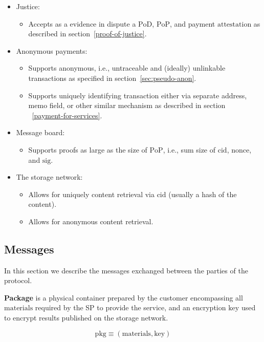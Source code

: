 \documentclass{ieeeaccess}
\begin{document}
\begin{itemize}
\item Justice:
    \begin{itemize}
        \item Accepts as a evidence in dispute a $\mathrm{PoD}$, $\mathrm{PoP}$, and payment $\mathrm{attestation}$ as described in section~\ref{proof-of-justice}.
    \end{itemize}

\item Anonymous payments:
    \begin{itemize}
        \item Supports anonymous, i.e., untraceable and (ideally) unlinkable transactions as specified in section~\ref{sec:pseudo-anon}.
        \item Supports uniquely identifying transaction either via separate address, memo field, or other similar mechanism as described in section ~\ref{payment-for-services}. 
    \end{itemize}

\item Message board:
    \begin{itemize}
        \item Supports proofs as large as the size of $\mathrm{PoP}$, i.e., sum size of $\mathrm{cid}$, $\mathrm{nonce}$, and $\mathrm{sig}$.
    \end{itemize}

\item The storage network:
    \begin{itemize}
        \item Allows for uniquely content retrieval via $\mathrm{cid}$ (usually a hash of the content).
        \item Allows for anonymous content retrieval.
    \end{itemize}
\end{itemize}

\subsection{Messages}\label{messages}
In this section we describe the messages exchanged between the parties of the protocol.

\noindent \textbf
{Package}\label{package} is a physical container prepared by the customer encompassing all $\mathrm{materials}$ required by the SP to provide the service, and an encryption $\mathrm{key}$ used to encrypt results published on the storage network.

$$\mathrm{pkg} \equiv (\mathrm{materials}, \mathrm{key})$$
\end{document}
